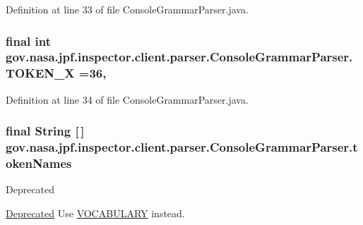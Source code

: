 Definition at line 33 of file Console\+Grammar\+Parser.\+java.

\subsubsection[{\texorpdfstring{T\+O\+K\+E\+N\+\_\+X}{TOKEN_X}}]{\setlength{\rightskip}{0pt plus 5cm}final int gov.\+nasa.\+jpf.\+inspector.\+client.\+parser.\+Console\+Grammar\+Parser.\+T\+O\+K\+E\+N\+\_\+X =36\hspace{0.3cm}{\ttfamily [static]}, {\ttfamily [package]}}\hypertarget{classgov_1_1nasa_1_1jpf_1_1inspector_1_1client_1_1parser_1_1_console_grammar_parser_a2e3a8e3d1b5323e752e60b320faa5ab0}{}\label{classgov_1_1nasa_1_1jpf_1_1inspector_1_1client_1_1parser_1_1_console_grammar_parser_a2e3a8e3d1b5323e752e60b320faa5ab0}


Definition at line 34 of file Console\+Grammar\+Parser.\+java.

\subsubsection[{\texorpdfstring{token\+Names}{tokenNames}}]{\setlength{\rightskip}{0pt plus 5cm}final String \mbox{[}$\,$\mbox{]} gov.\+nasa.\+jpf.\+inspector.\+client.\+parser.\+Console\+Grammar\+Parser.\+token\+Names\hspace{0.3cm}{\ttfamily [static]}}\hypertarget{classgov_1_1nasa_1_1jpf_1_1inspector_1_1client_1_1parser_1_1_console_grammar_parser_ad68767244e9d95432268dbec96cd0a10}{}\label{classgov_1_1nasa_1_1jpf_1_1inspector_1_1client_1_1parser_1_1_console_grammar_parser_ad68767244e9d95432268dbec96cd0a10}
\begin{DoxyRefDesc}{Deprecated}
\item[\hyperlink{deprecated__deprecated000002}{Deprecated}]Use \hyperlink{classgov_1_1nasa_1_1jpf_1_1inspector_1_1client_1_1parser_1_1_console_grammar_parser_a7b41c74d131a98a81fe94c9a9e7be972}{V\+O\+C\+A\+B\+U\+L\+A\+RY} instead.\end{DoxyRefDesc}


